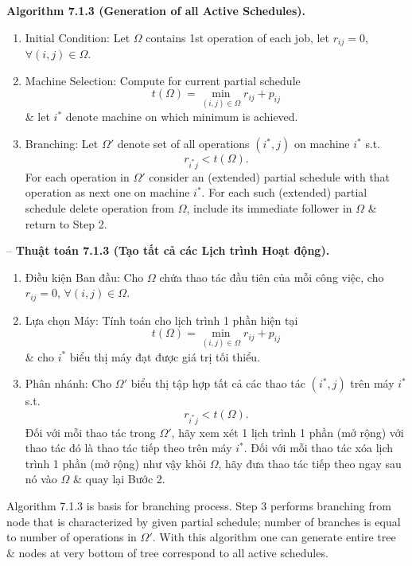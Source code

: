 \documentclass{article}
\begin{document}
\begin{itemize}
\begin{itemize}
        {\bf Algorithm 7.1.3 (Generation of all Active Schedules).}
        \begin{enumerate}
            \item Initial Condition: Let $\Omega$ contains 1st operation of each job, let $r_{ij} = 0$, $\forall(i,j)\in\Omega$.
            \item Machine Selection: Compute for current partial schedule
            \begin{equation*}
                t(\Omega) = \min_{(i,j)\in\Omega} r_{ij} + p_{ij}
            \end{equation*}
            \& let $i^*$ denote machine on which minimum is achieved.
            \item Branching: Let $\Omega'$ denote set of all operations $(i^*,j)$ on machine $i^*$ s.t.
            \begin{equation*}
                r_{i^*j} < t(\Omega).
            \end{equation*}
            For each operation in $\Omega'$ consider an (extended) partial schedule with that operation as next one on machine $i^*$. For each such (extended) partial schedule delete operation from $\Omega$, include its immediate follower in $\Omega$ \& return to Step 2.
        \end{enumerate}
        -- {\bf Thuật toán 7.1.3 (Tạo tất cả các Lịch trình Hoạt động).}
        \begin{enumerate}
            \item Điều kiện Ban đầu: Cho $\Omega$ chứa thao tác đầu tiên của mỗi công việc, cho $r_{ij} = 0$, $\forall(i,j)\in\Omega$.
            \item Lựa chọn Máy: Tính toán cho lịch trình 1 phần hiện tại
            \begin{equation*}
                t(\Omega) = \min_{(i,j)\in\Omega} r_{ij} + p_{ij}
            \end{equation*}
            \& cho $i^*$ biểu thị máy đạt được giá trị tối thiểu.
            \item Phân nhánh: Cho $\Omega'$ biểu thị tập hợp tất cả các thao tác $(i^*,j)$ trên máy $i^*$ s.t.
            \begin{equation*}
                r_{i^*j} < t(\Omega).
            \end{equation*}
            Đối với mỗi thao tác trong $\Omega'$, hãy xem xét 1 lịch trình 1 phần (mở rộng) với thao tác đó là thao tác tiếp theo trên máy $i^*$. Đối với mỗi thao tác xóa lịch trình 1 phần (mở rộng) như vậy khỏi $\Omega$, hãy đưa thao tác tiếp theo ngay sau nó vào $\Omega$ \& quay lại Bước 2.
        \end{enumerate}
        Algorithm 7.1.3 is basis for branching process. Step 3 performs branching from node that is characterized by given partial schedule; number of branches is equal to number of operations in $\Omega'$. With this algorithm one can generate entire tree \& nodes at very bottom of tree correspond to all active schedules.


\end{itemize}
\end{itemize}
\end{document}
